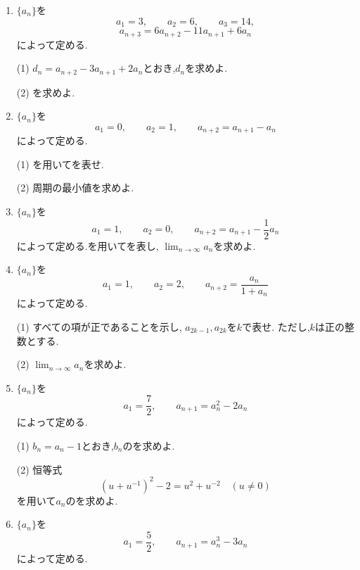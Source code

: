\begin{enumerate}[label=\textbf{問\arabic*.},leftmargin=3.8em,format=\bookitemlink{practice-special}{problem}{hint}]
    (2) を求めよ.
  \item {}$\{a_n\}$を
    \[
      a_1=3,\qquad a_2=6,\qquad a_3=14,
    \]
    \[
      a_{n+3}=6a_{n+2}-11a_{n+1}+6a_n
    \]
    によって定める.
    \par\smallskip\noindent
    (1) $d_n=a_{n+2}-3a_{n+1}+2a_n$とおき,$d_n$を求めよ.
    \par\smallskip\noindent
    (2) を求めよ.
  \item {}$\{a_n\}$を
    \[
      a_1=0,\qquad a_2=1,\qquad
      a_{n+2}=a_{n+1}-a_n
    \]
    によって定める.
    \par\smallskip\noindent
    (1) を用いてを表せ.
    \par\smallskip\noindent
    (2) 周期の最小値を求めよ.
  \item {}$\{a_n\}$を
    \[
      a_1=1,\qquad a_2=0,\qquad
      a_{n+2}=a_{n+1}-\frac12a_n
    \]
    によって定める.を用いてを表し,
    $\lim_{n\to\infty}a_n$を求めよ.
  \item {}$\{a_n\}$を
    \[
      a_1=1,\qquad a_2=2,\qquad
      a_{n+2}=\frac{a_n}{1+a_n}
    \]
    によって定める.
    \par\smallskip\noindent
    (1) すべての項が正であることを示し,
    $a_{2k-1},a_{2k}$を$k$で表せ.
    ただし,$k$は正の整数とする.
    \par\smallskip\noindent
    (2) $\lim_{n\to\infty}a_n$を求めよ.
  \item {}$\{a_n\}$を
    \[
      a_1=\frac72,\qquad
      a_{n+1}=a_n^2-2a_n
    \]
    によって定める.
    \par\smallskip\noindent
    (1) $b_n=a_n-1$とおき,$b_n$のを求めよ.
    \par\smallskip\noindent
    (2) 恒等式
    \[
      \left(u+u^{-1}\right)^2-2=u^2+u^{-2}
      \quad(u\ne0)
    \]
    を用いて$a_n$のを求めよ.
  \item {}$\{a_n\}$を
    \[
      a_1=\frac52,\qquad
      a_{n+1}=a_n^3-3a_n
    \]
    によって定める.
    \par\smallskip\noindent

\end{enumerate}
